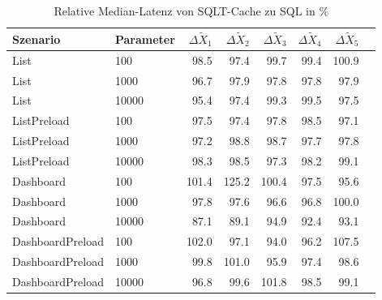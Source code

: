
\begin{table}[ht]
\setlength{\extrarowheight}{-1pt}
\centering
\caption{Relative Median-Latenz von SQLT-Cache zu SQL in \%}
\begin{tabular}{llrrrrrr}
\toprule
Szenario & Parameter & ${\Delta \tilde{X}_1}$ & ${\Delta \tilde{X}_2}$ & ${\Delta \tilde{X}_3}$ & ${\Delta \tilde{X}_4}$ & ${\Delta \tilde{X}_5}$ \\
\midrule
	List & 100 &  98.5 & \cellcolor{green!11}  97.4 &  99.7 &  99.4 &  100.9 \\
	List & 1000 & \cellcolor{green!11}  96.7 & \cellcolor{green!11}  97.9 & \cellcolor{green!11}  97.8 & \cellcolor{green!11}  97.8 & \cellcolor{green!11}  97.9 \\
	List & 10000 & \cellcolor{green!12}  95.4 & \cellcolor{green!11}  97.4 &  99.3 &  99.5 & \cellcolor{green!11}  97.5 \\
	ListPreload & 100 & \cellcolor{green!11}  97.5 & \cellcolor{green!11}  97.4 & \cellcolor{green!11}  97.8 &  98.5 & \cellcolor{green!11}  97.1 \\
	ListPreload & 1000 & \cellcolor{green!11}  97.2 &  98.8 &  98.7 & \cellcolor{green!11}  97.7 & \cellcolor{green!11}  97.8 \\
	ListPreload & 10000 &  98.3 &  98.5 & \cellcolor{green!11}  97.3 &  98.2 &  99.1 \\
	Dashboard & 100 &  101.4 & \cellcolor{red!20}  125.2 &  100.4 & \cellcolor{green!11}  97.5 & \cellcolor{green!12}  95.6 \\
	Dashboard & 1000 & \cellcolor{green!11}  97.8 & \cellcolor{green!11}  97.6 & \cellcolor{green!11}  96.6 & \cellcolor{green!11}  96.8 &  100.0 \\
	Dashboard & 10000 & \cellcolor{green!15}  87.1 & \cellcolor{green!14}  89.1 & \cellcolor{green!12}  94.9 & \cellcolor{green!13}  92.4 & \cellcolor{green!13}  93.1 \\
	DashboardPreload & 100 &  102.0 & \cellcolor{green!11}  97.1 & \cellcolor{green!12}  94.0 & \cellcolor{green!12}  96.2 & \cellcolor{red!13}  107.5 \\
	DashboardPreload & 1000 &  99.8 &  101.0 & \cellcolor{green!12}  95.9 & \cellcolor{green!11}  97.4 &  98.6 \\
	DashboardPreload & 10000 & \cellcolor{green!11}  96.8 &  99.6 &  101.8 &  98.5 &  99.1 \\
\bottomrule
\end{tabular}
\label{tab:relativer_durchsatz_sqltcache}
\end{table}
	